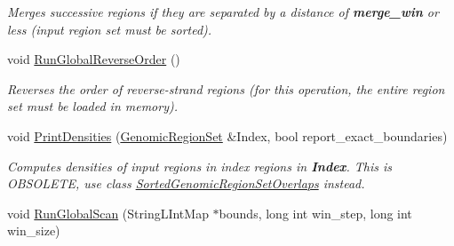 \begin{CompactItemize}
\begin{CompactList}\small\item\em Merges successive regions if they are separated by a distance of {\bf merge\_\-win} or less (input region set must be sorted). \item\end{CompactList}\item 
\hypertarget{classGenomicRegionSet_962bb1b26543df14b324d7ab4dd8e404}{
void \hyperlink{classGenomicRegionSet_962bb1b26543df14b324d7ab4dd8e404}{RunGlobalReverseOrder} ()}
\label{classGenomicRegionSet_962bb1b26543df14b324d7ab4dd8e404}

\begin{CompactList}\small\item\em Reverses the order of reverse-strand regions (for this operation, the entire region set must be loaded in memory). \item\end{CompactList}\item 
\hypertarget{classGenomicRegionSet_b8abdbc3c1f4530dc1992fb0766ba5a4}{
void \hyperlink{classGenomicRegionSet_b8abdbc3c1f4530dc1992fb0766ba5a4}{PrintDensities} (\hyperlink{classGenomicRegionSet}{GenomicRegionSet} \&Index, bool report\_\-exact\_\-boundaries)}
\label{classGenomicRegionSet_b8abdbc3c1f4530dc1992fb0766ba5a4}

\begin{CompactList}\small\item\em Computes densities of input regions in index regions in {\bf Index}. This is OBSOLETE, use class \hyperlink{classSortedGenomicRegionSetOverlaps}{SortedGenomicRegionSetOverlaps} instead. \item\end{CompactList}\item 
\hypertarget{classGenomicRegionSet_14610521cc47631b1459c2e3488b0eec}{
void \hyperlink{classGenomicRegionSet_14610521cc47631b1459c2e3488b0eec}{RunGlobalScan} (StringLIntMap $\ast$bounds, long int win\_\-step, long int win\_\-size)}
\label{classGenomicRegionSet_14610521cc47631b1459c2e3488b0eec}


\end{CompactItemize}

